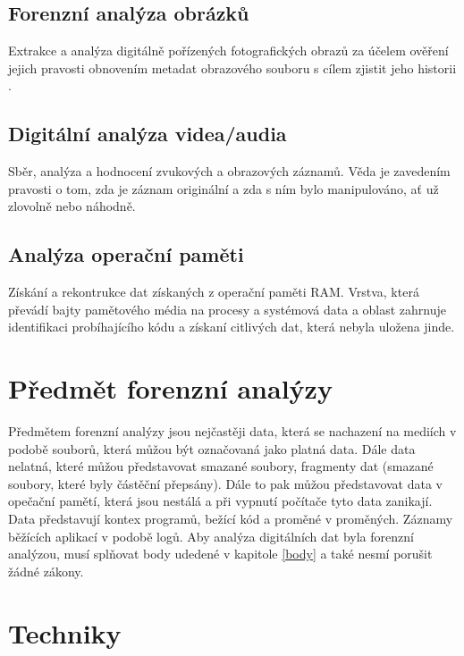\documentclass[thesis=B,czech]{FITthesis}[2012/06/26]
\begin{document}
\subsection{Forenzní analýza obrázků}
Extrakce a analýza digitálně pořízených fotografických obrazů za účelem ověření jejich pravosti obnovením metadat obrazového souboru s cílem zjistit jeho historii \cite{for_types}.

\subsection{Digitální analýza videa/audia}
Sběr, analýza a hodnocení zvukových a obrazových záznamů. Věda je zavedením pravosti o tom, zda je záznam originální a zda s ním bylo manipulováno, ať už zlovolně nebo náhodně.

\subsection{Analýza operační paměti}
Získání a rekontrukce dat získaných z operační paměti RAM. Vrstva, která převádí bajty pamětového média na procesy a systémová data a oblast zahrnuje identifikaci probíhajícího kódu a získaní citlivých dat, která nebyla uložena jinde\cite{carrier2003defining}. 

\section{Předmět forenzní analýzy}

Předmětem forenzní analýzy jsou nejčastěji data, která se nachazení na mediích v podobě souborů, která můžou být označovaná jako platná data. Dále data nelatná, které můžou představovat smazané soubory, fragmenty dat (smazané soubory, které byly částěční přepsány). Dále to pak můžou představovat data v opečační pamětí, která jsou nestálá a při vypnutí počítače tyto data zanikají. Data představují kontex programů, bežící kód a proměné v proměných. Záznamy běžících aplikací v podobě logů. 
Aby analýza digitálních dat byla forenzní analýzou, musí splňovat body udedené v kapitole \ref{body} a také nesmí porušit  žádné zákony.

\section{Techniky}
\end{document}
